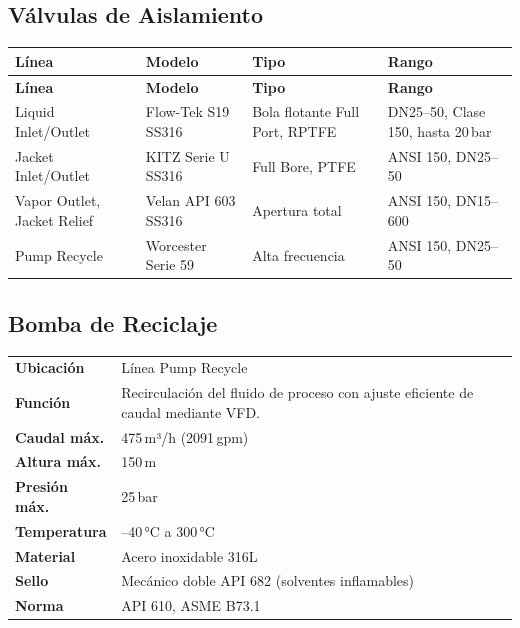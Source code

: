 \documentclass[12pt,letterpaper]{article}
\begin{document}
\subsection{Válvulas de Aislamiento}

\renewcommand{\arraystretch}{1.3}
\begin{longtable}{L{3cm} L{3.5cm} L{3.5cm} L{4.5cm}}
\toprule
{}
\color{white}\textbf{Línea} & \color{white}\textbf{Modelo} & \color{white}\textbf{Tipo} & \color{white}\textbf{Rango} \\
\midrule
\endfirsthead
\toprule
{}
\color{white}\textbf{Línea} & \color{white}\textbf{Modelo} & \color{white}\textbf{Tipo} & \color{white}\textbf{Rango} \\
\midrule
\endhead
\bottomrule
\endfoot
Liquid Inlet/Outlet  & Flow-Tek S19 SS316 & Bola flotante Full Port, RPTFE & DN25--50, Clase 150, hasta 20\,bar \\
Jacket Inlet/Outlet  & KITZ Serie U SS316 & Full Bore, PTFE & ANSI 150, DN25--50 \\
Vapor Outlet, Jacket Relief & Velan API 603 SS316 & Apertura total & ANSI 150, DN15--600 \\
Pump Recycle         & Worcester Serie 59 & Alta frecuencia & ANSI 150, DN25--50 \\
\bottomrule
\end{longtable}

\subsection{Bomba de Reciclaje}

\begin{especbox}[title={Bomba Centrífuga — Flowserve Durco Mark 3 ISO + VFD}]
\renewcommand{\arraystretch}{1.25}
\begin{tabular}{L{4cm} L{9.5cm}}
\textbf{Ubicación}      & Línea Pump Recycle \\
\textbf{Función}        & Recirculación del fluido de proceso con ajuste eficiente de caudal mediante VFD. \\
\textbf{Caudal máx.}   & 475\,m³/h (2091\,gpm) \\
\textbf{Altura máx.}   & 150\,m \\
\textbf{Presión máx.}  & 25\,bar \\
\textbf{Temperatura}   & --40\,°C a 300\,°C \\
\textbf{Material}       & Acero inoxidable 316L \\
\textbf{Sello}          & Mecánico doble API 682 (solventes inflamables) \\
\textbf{Norma}          & API 610, ASME B73.1 \\
\end{tabular}
\end{especbox}
\end{document}
